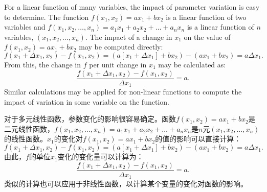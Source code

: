 \begin{original}
For a linear function of many variables, the impact of parameter variation is easy to determine. The function $f(x_1, x_2) = a x_1 + b x_2$ is a linear function of two variables and $f(x_1, x_2, \dots, x_n) = a_1 x_1 + a_2 x_2 + \dots + a_n x_n$ is a linear function of $n$ variables, $(x_1, x_2, \dots, x_n)$. The impact of a change in $x_1$ on the value of $f(x_1, x_2) = a x_1 + b x_2$ may be computed directly:
\[
f(x_1 + \Delta x_1, x_2) - f(x_1, x_2) = (a[x_1 + \Delta x_1] + b x_2) - (a x_1 + b x_2) = a \Delta x_1.
\]
From this, the change in $f$ per unit change in $x_1$ may be calculated as:
\[
\frac{f(x_1 + \Delta x_1, x_2) - f(x_1, x_2)}{\Delta x_1} = a.
\]
Similar calculations may be applied for non-linear functions to compute the impact of variation in some variable on the function.
\end{original}
\begin{translation}
对于多元线性函数，参数变化的影响很容易确定。函数$f(x_1, x_2) = a x_1 + b x_2$是二元线性函数，$f(x_1, x_2, \dots, x_n) = a_1 x_1 + a_2 x_2 + \dots + a_n x_n$是$n$元$(x_1, x_2, \dots, x_n)$的线性函数。$x_1$的变化对$f(x_1, x_2) = a x_1 + b x_2$的值的影响可以直接计算：
\[
f(x_1 + \Delta x_1, x_2) - f(x_1, x_2) = (a[x_1 + \Delta x_1] + b x_2) - (a x_1 + b x_2) = a \Delta x_1.
\]
由此，$f$的单位$x_1$变化的变化量可以计算为：
\[
\frac{f(x_1 + \Delta x_1, x_2) - f(x_1, x_2)}{\Delta x_1} = a.
\]
类似的计算也可以应用于非线性函数，以计算某个变量的变化对函数的影响。
\end{translation}

